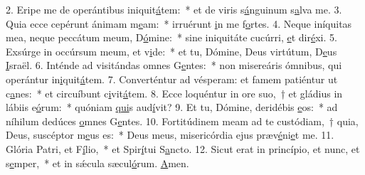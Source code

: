 2. Eripe me de operántibus iniquit\uline{á}tem:~* et de viris s\uline{á}nguinum s\uline{a}lva me.
3. Quia ecce cepérunt ánimam m\uline{e}am:~* irruérunt \uline{i}n me f\uline{o}rtes.
4. Neque iníquitas mea, neque peccátum meum, D\uline{ó}mine:~* sine iniquitáte cucúrri, \uline{e}t dir\uline{é}xi.
5. Exsúrge in occúrsum meum, et v\uline{i}de:~* et tu, Dómine, Deus virtútum, D\uline{e}us \uline{I}sraël.
6. Inténde ad visitándas omnes G\uline{e}ntes:~* non misereáris ómnibus, qui operántur in\uline{i}quit\uline{á}tem.
7. Converténtur ad vésperam: et famem patiéntur ut c\uline{a}nes:~* et circuíbunt c\uline{i}vit\uline{á}tem.
8. Ecce loquéntur in ore suo,~† et gládius in lábiis e\uline{ó}rum:~* quóniam \uline{qui}s aud\uline{í}vit?
9. Et tu, Dómine, deridébis \uline{e}os:~* ad níhilum dedúces \uline{o}mnes G\uline{e}ntes.
10. Fortitúdinem meam ad te custódiam,~† quia, Deus, suscéptor m\uline{e}us es:~* Deus meus, misericórdia ejus præv\uline{é}ni\uline{e}t me.
11. Glória Patri, et F\uline{í}lio,~* et Spir\uline{í}tui S\uline{a}ncto.
12. Sicut erat in princípio, et nunc, et s\uline{e}mper,~* et in sǽcula sæcul\uline{ó}rum. \uline{A}men.
